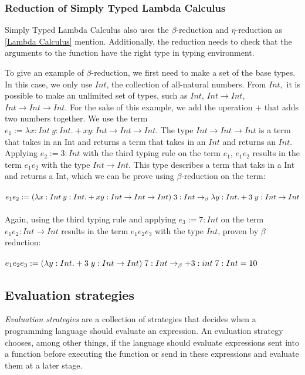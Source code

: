 \subsubsection{Reduction of Simply Typed Lambda Calculus}
Simply Typed Lambda Calculus also uses the $\beta$-reduction and $\eta$-reduction as \autoref{Lambda Calculus} mention. Additionally, the reduction needs to check that the arguments to the function have the right type in typing environment. 

\para
To give an example of $\beta$-reduction, we first need to make a set of the base types. In this case, we only use $Int$, the collection of all-natural numbers. From $Int$, it is possible to make an unlimited set of types, such as $Int$, $Int \rightarrow Int$, $Int \rightarrow Int \rightarrow Int$. For the sake of this example, we add the operation $+$ that adds two numbers together. We use the term $e_1:= \lambda x:Int\: y:Int. + x y:Int \rightarrow Int \rightarrow Int$. The type $Int \rightarrow Int \rightarrow Int$ is a term that takes in an Int and returns a term that takes in an $Int$ and returns an $Int$. Applying $e_2 := 3:Int$ with the third typing rule on the term $e_1$, $e_1 e_2$ results in the term $e_1 e_2$ with the type $Int \rightarrow Int$. This type describes a term that taks in a Int and returns a Int, which we can be prove using $\beta$-reduction on the term:
\\ \\
$e_1 e_2 := (\lambda x:Int\: y:Int. + x y:Int \rightarrow Int \rightarrow Int)\; 3:Int 
\newline\rightarrow_\beta \lambda y:Int. + 3\; y: Int \rightarrow Int$
\\ \\
Again, using the third typing rule and applying $e_3 := 7:Int$ on the term $e_1 e_2:Int \rightarrow Int$ results in the term $e_1 e_2 e_3$ with the type $Int$, proven by $\beta$ reduction: 
\\ \\
$e_1 e_2 e_3 := (\lambda y:Int. + 3\; y: Int \rightarrow Int) \; 7:Int
\newline \rightarrow_\beta + 3:int \; 7:Int = 10$

\subsection{Evaluation strategies}
\emph{Evaluation strategies} are a collection of strategies that decides when a programming language should evaluate an expression. An evaluation strategy chooses, among other things, if the language should evaluate expressions sent into a function before executing the function or send in these expressions and evaluate them at a later stage.

